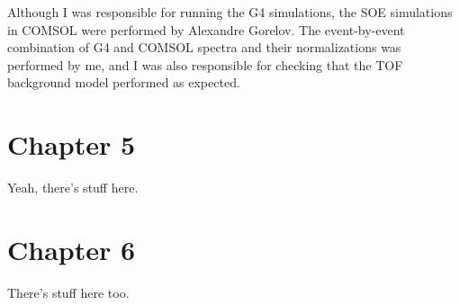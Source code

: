 \begin{preface}
Although I was responsible for running the G4 simulations, the SOE simulations in COMSOL were performed by Alexandre Gorelov.  The event-by-event combination of G4 and COMSOL spectra and their normalizations was performed by me, and I was also responsible for checking that the TOF background model performed as expected.  
\section{Chapter 5}
Yeah, there's stuff here.
\section{Chapter 6}
There's stuff here too. 

\end{preface}
